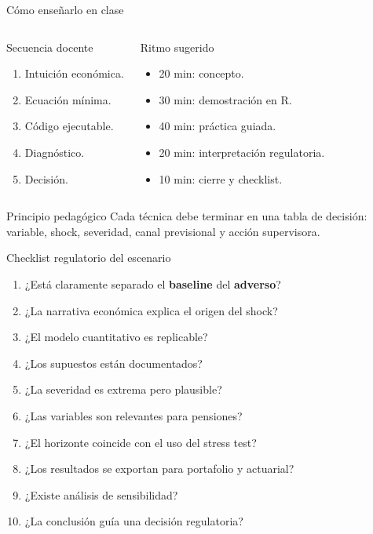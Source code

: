 \documentclass[10pt,aspectratio=169]{beamer}
\newcommand{\baseline}{\textcolor{MacropolTeal}{\textbf{baseline}}}
\newcommand{\adverso}{\textcolor{red!70!black}{\textbf{adverso}}}
\begin{document}
\begin{frame}{Cómo enseñarlo en clase}
\begin{columns}
\begin{block}{Secuencia docente}
\begin{enumerate}
  \item Intuición económica.
  \item Ecuación mínima.
  \item Código ejecutable.
  \item Diagnóstico.
  \item Decisión.
\end{enumerate}
\end{block}

\begin{block}{Ritmo sugerido}
\begin{itemize}
  \item 20 min: concepto.
  \item 30 min: demostración en R.
  \item 40 min: práctica guiada.
  \item 20 min: interpretación regulatoria.
  \item 10 min: cierre y checklist.
\end{itemize}
\end{block}
\end{columns}

\vspace{0.4em}
\begin{block}{Principio pedagógico}
Cada técnica debe terminar en una tabla de decisión: variable, shock, severidad, canal previsional y acción supervisora.
\end{block}
\end{frame}

\begin{frame}{Checklist regulatorio del escenario}
\begin{enumerate}
  \item ¿Está claramente separado el \baseline{} del \adverso{}?
  \item ¿La narrativa económica explica el origen del shock?
  \item ¿El modelo cuantitativo es replicable?
  \item ¿Los supuestos están documentados?
  \item ¿La severidad es extrema pero plausible?
  \item ¿Las variables son relevantes para pensiones?
  \item ¿El horizonte coincide con el uso del stress test?
  \item ¿Los resultados se exportan para portafolio y actuarial?
  \item ¿Existe análisis de sensibilidad?
  \item ¿La conclusión guía una decisión regulatoria?
\end{enumerate}
\end{frame}
\end{document}
